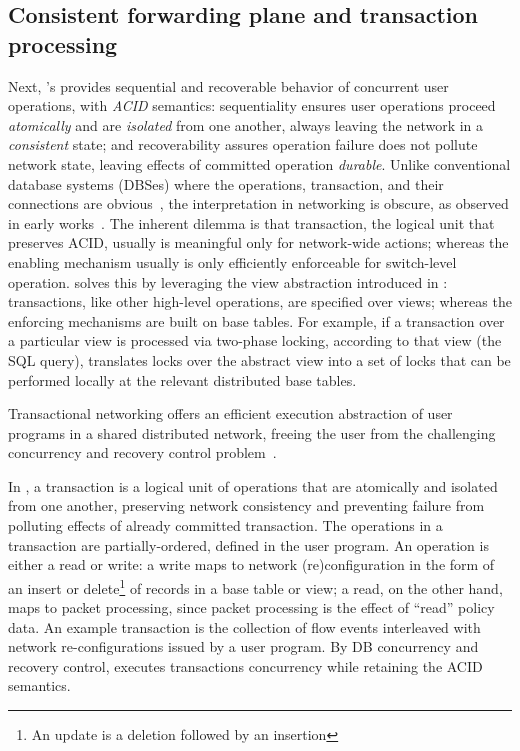 \subsection{Consistent forwarding plane and transaction processing}


Next, \Sys's \TR provides sequential and recoverable behavior of
concurrent user operations, with \textit{ACID} semantics:
sequentiality ensures user operations proceed \textit{atomically} and
are \textit{isolated} from one another, always leaving the network in
a \textit{consistent} state; and recoverability assures operation
failure does not pollute network state, leaving effects of committed
operation \textit{durable}. Unlike conventional database systems
(DBSes) where the operations, transaction, and their connections are
obvious~\cite{Bernstein:concurrency-recovery,concurrency-recovery-alg,principles-tp,concurrency-ddb},
the interpretation in networking is obscure, as observed in early
works~\cite{hotsdn-transactional-networking,On-Consistent-Updates,of-cpp}.
The inherent dilemma is that transaction, the logical unit that
preserves ACID, usually is meaningful only for network-wide actions;
whereas the enabling mechanism usually is only efficiently enforceable
for switch-level operation. \TTR solves this by leveraging the view
abstraction introduced in \TI: transactions, like other high-level
operations, are specified over views; whereas the enforcing mechanisms
are built on base tables.  For example, if a transaction over a
particular view is processed via two-phase locking, according to that
view (the SQL query), \Sys translates locks over the abstract view
into a set of locks that can be performed locally at the relevant
distributed base tables.


Transactional networking offers an efficient execution abstraction of
user programs in a shared distributed network, freeing the user from
the challenging concurrency and recovery control
problem~\cite{consistency-lock,concurrency-recovery-alg,principles-tp,concurrency-ddb,Tc-ddb,crdb}.

 In \Sys, a
transaction is a logical unit of operations that are atomically and
isolated from one another, preserving network consistency and
preventing failure from polluting effects of already committed
transaction. The operations in a transaction are partially-ordered,
defined in the user program. An operation is either a read or write: a
write maps to network (re)configuration in the form of an insert or
delete\footnote{An update is a deletion followed by an insertion} of
records in a base table or view; a read, on the other hand, maps to
packet processing, since packet processing is the effect of ``read''
policy data. An example transaction is the collection of flow events
interleaved with network re-configurations issued by a user
program. By DB concurrency and recovery control, \Sys executes
transactions concurrency while retaining the ACID semantics.

